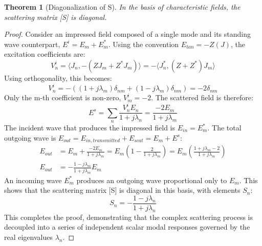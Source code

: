 \documentclass[11pt,a4paper]{article}
\newcommand{\avg}[1]{\langle #1 \rangle} %
\newtheorem{theorem}{Theorem}[section]
\begin{document}
\begin{theorem}[Diagonalization of S]
In the basis of characteristic fields, the scattering matrix [S] is diagonal.
\end{theorem}
\begin{proof}
Consider an impressed field composed of a single mode and its standing wave counterpart, \(E^{i}=E_{m}+E_{m}^{*}\). Using the convention \(E_{tan}=-Z(J)\), the excitation coefficients are:
\begin{equation}
    V_{n}^{i}=\avg{ J_{n},-(ZJ_{m}+Z^{*}J_{m})}=-\avg{ J_{n}^{*},(Z+Z^{*})J_{m}}
\end{equation}
Using orthogonality, this becomes:
\begin{equation}
    V_{n}^{i}=-((1+j\lambda_{m})\delta_{nm}+(1-j\lambda_{m})\delta_{nm})=-2\delta_{nm}
\end{equation}
Only the m-th coefficient is non-zero, \(V_{m}^{i}=-2\). The scattered field is therefore:
\begin{equation}
    E^{s}=\sum_{n}\frac{V_{n}^{i}E_{n}}{1+j\lambda_{n}}=\frac{-2E_{m}}{1+j\lambda_{m}}
\end{equation}
The incident wave that produces the impressed field is \(E_{in}=E_{m}^{*}\). The total outgoing wave is \(E_{out}=E_{in,transmitted}+E_{scat}=E_{m}+E^{s}\):
\begin{align}
    E_{out} &= E_{m}+\frac{-2E_{m}}{1+j\lambda_{m}} = E_{m}\left(1-\frac{2}{1+j\lambda_{m}}\right) = E_{m}\left(\frac{1+j\lambda_{m}-2}{1+j\lambda_{m}}\right) \\
    E_{out} &= -\frac{1-j\lambda_{m}}{1+j\lambda_{m}}E_{m}
\end{align}
An incoming wave \(E_{m}^{*}\) produces an outgoing wave proportional only to \(E_{m}\). This shows that the scattering matrix [S] is diagonal in this basis, with elements \(S_{n}\):
\begin{equation}
    S_{n}=-\frac{1-j\lambda_{n}}{1+j\lambda_{n}}
\end{equation}
This completes the proof, demonstrating that the complex scattering process is decoupled into a series of independent scalar modal responses governed by the real eigenvalues \(\lambda_{n}\).
\end{proof}
\end{document}
